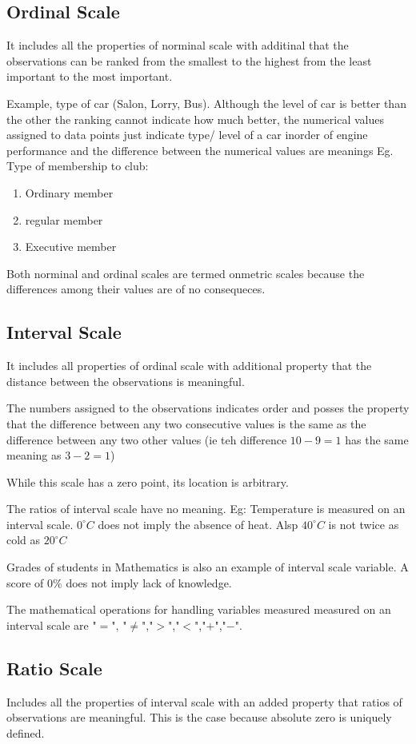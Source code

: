 \documentclass[12pt]{article}
\begin{document}
\subsection{Ordinal Scale}
It includes all the properties of norminal scale with additinal that the observations can be ranked from the smallest to the highest from the least important to the most important.

Example, type of car (Salon, Lorry, Bus).
Although the level of car is better than the other the ranking cannot indicate how much better, the numerical values assigned to data points just indicate type/ level of a car inorder of engine performance and the difference between the numerical values are meanings Eg. Type of membership to club:
\begin{enumerate}
    \item Ordinary member
    \item regular member
    \item Executive member
\end{enumerate}
Both norminal and ordinal scales are termed onmetric scales because the differences among their values are of no consequeces.
\subsection{Interval Scale}
It includes all properties of ordinal scale with additional property that the distance between the observations is meaningful.

The numbers assigned to the observations indicates order and posses the property that the difference between any two consecutive values is the same as the difference between any two other values (ie teh difference $10 - 9 = 1$ has the same meaning as $3 - 2 = 1$)

While this scale has a zero point, its location is arbitrary.

The ratios of interval scale have no meaning.
Eg: Temperature is measured on an interval scale. $0^{\circ}C$ does not imply the absence of heat. Alsp $40^{\circ}C$ is not twice as cold as $20^{\circ}C$

Grades of students in Mathematics is also an example of interval scale variable. A score of $0\%$ does not imply lack of knowledge.

The mathematical operations for handling variables measured measured on an interval scale are "$=$", "$\neq$","$>$","$<$","$+$","$-$".
\subsection{Ratio Scale}
Includes all the properties of interval scale with an added property that ratios of observations are meaningful. This is the case because absolute zero is uniquely defined.
\end{document}
